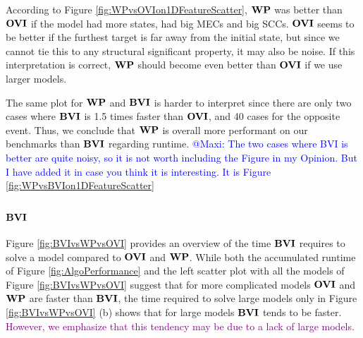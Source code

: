 According to Figure \ref{fig:WPvsOVIon1DFeatureScatter}, $\mathbf{WP}$ was better than $\mathbf{OVI}$ if the model had more states, had big MECs and big SCCs.
$\mathbf{OVI}$ seems to be better if the furthest target is far away from the initial state, but since we cannot tie this to any structural significant property,
it may also be noise. If this interpretation is correct, $\mathbf{WP}$ should become even better than $\mathbf{OVI}$ if we use larger models.

The same plot for $\mathbf{WP}$ and $\mathbf{BVI}$ is harder to interpret since there are only two cases where $\mathbf{BVI}$ is 1.5 times faster than $\mathbf{OVI}$, and 40 cases
for the opposite event. Thus, we conclude that $\mathbf{WP}$ is overall more performant on our benchmarks than $\mathbf{BVI}$ regarding runtime. 
\textcolor{blue}{@Maxi: The two cases where BVI is better are quite noisy, so it is not worth including the Figure in my Opinion.
But I have added it in case you think it is interesting. It is Figure \ref{fig:WPvsBVIon1DFeatureScatter}}
\fi

\subsubsection*{$\mathbf{BVI}$}

Figure \ref{fig:BVIvsWPvsOVI} provides an overview of the time $\mathbf{BVI}$ requires to solve a model compared to $\mathbf{OVI}$ and $\mathbf{WP}$.
While both the accumulated runtime of Figure \ref{fig:AlgoPerformance} and the left scatter plot with all the models of Figure \ref{fig:BVIvsWPvsOVI}
suggest that for more complicated models $\mathbf{OVI}$ and $\mathbf{WP}$ are faster than $\mathbf{BVI}$, the time required to solve large models only in Figure \ref{fig:BVIvsWPvsOVI} (b)
shows that for large models $\mathbf{BVI}$ tends to be faster. \textcolor{purple}{However, we emphasize that this tendency may be due to a lack of large models.}

